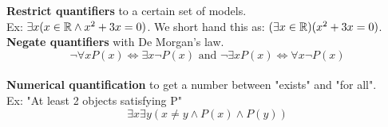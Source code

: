 \documentclass[12pt, letterpaper]{article}
\begin{document}
\textbf{Restrict quantifiers} to a certain set of models.
\\Ex: $\exists x(x\in\mathbb{R}\land x^2+3x=0)$.
We short hand this as: $(\exists x\in\mathbb{R})(x^2+3x=0)$.
\\\textbf{Negate quantifiers} with De Morgan's law.
$$\lnot\forall xP(x)\iff\exists x\lnot P(x) \text{ and } \lnot\exists xP(x)\iff\forall x\lnot P(x)$$
\\\textbf{Numerical quantification} to
get a number between "exists" and "for all".
\\Ex: "At least 2 objects satisfying P"
$$\exists x\exists y(x\neq y\land P(x)\land P(y))$$
\end{document}
